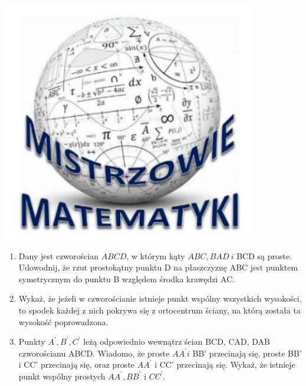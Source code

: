 \documentclass[10pt]{article}
\begin{document}
\begin{center}
\includegraphics[max width=\textwidth]{2024_11_21_1ca1e102a2a12bbb9a94g-1}
\end{center}

\begin{enumerate}
  \item Dany jest czworościan \(A B C D\), w którym kąty \(A B C, B A D ~ i\) BCD są proste. Udowodnij, że rzut prostokątny punktu D na płaszczyznę ABC jest punktem symetrycznym do punktu B względem środka krawędzi AC.
  \item Wykaż, że jeżeli w czworościanie istnieje punkt wspólny wszystkich wysokości, to spodek każdej z nich pokrywa się z ortocentrum ściany, na którą została ta wysokość poprowadzona.
  \item Punkty \(A^{\prime}, B^{\prime}, C^{\prime}\) leżą odpowiednio wewnątrz ścian BCD, CAD, DAB czworościanu ABCD. Wiadomo, że proste \(A A^{\prime} i\) BB' przecinają się, proste BB' i CC' przecinają się, oraz proste \(A A^{\prime}\) i CC' przecinają się. Wykaż, że istnieje punkt wspólny prostych \(A A^{\prime}, B B^{\prime}\) i \(C C^{\prime}\).
\end{enumerate}
\end{document}
